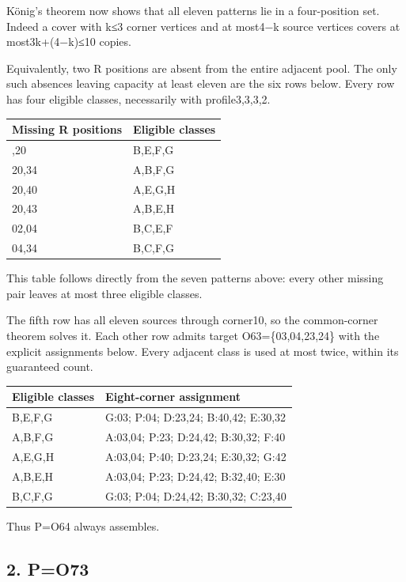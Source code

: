 \documentclass[
  10pt,
]{article}
\begin{document}
König's theorem now shows that all eleven patterns lie in a
four-position set. Indeed a cover with k≤3 corner vertices and at
most4−k source vertices covers at most3k+(4−k)≤10 copies.

Equivalently, two R positions are absent from the entire adjacent pool.
The only such absences leaving capacity at least eleven are the six rows
below. Every row has four eligible classes, necessarily with
profile3,3,3,2.

\begin{longtable}[]{@{}ll@{}}
\toprule\noalign{}
Missing R positions & Eligible classes \\
\midrule\noalign{}
\endhead
\bottomrule\noalign{}
\endlastfoot
04,20 & B,E,F,G \\
20,34 & A,B,F,G \\
20,40 & A,E,G,H \\
20,43 & A,B,E,H \\
02,04 & B,C,E,F \\
04,34 & B,C,F,G \\
\end{longtable}

This table follows directly from the seven patterns above: every other
missing pair leaves at most three eligible classes.

The fifth row has all eleven sources through corner10, so the
common-corner theorem solves it. Each other row admits target
O63=\{03,04,23,24\} with the explicit assignments below. Every adjacent
class is used at most twice, within its guaranteed count.

\begin{longtable}[]{@{}ll@{}}
\toprule\noalign{}
Eligible classes & Eight-corner assignment \\
\midrule\noalign{}
\endhead
\bottomrule\noalign{}
\endlastfoot
B,E,F,G & G:03; P:04; D:23,24; B:40,42; E:30,32 \\
A,B,F,G & A:03,04; P:23; D:24,42; B:30,32; F:40 \\
A,E,G,H & A:03,04; P:40; D:23,24; E:30,32; G:42 \\
A,B,E,H & A:03,04; P:23; D:24,42; B:32,40; E:30 \\
B,C,F,G & G:03; P:04; D:24,42; B:30,32; C:23,40 \\
\end{longtable}

Thus P=O64 always assembles.

\hypertarget{po73}{%
\subsection*{2. P=O73}\label{po73}}
\end{document}
